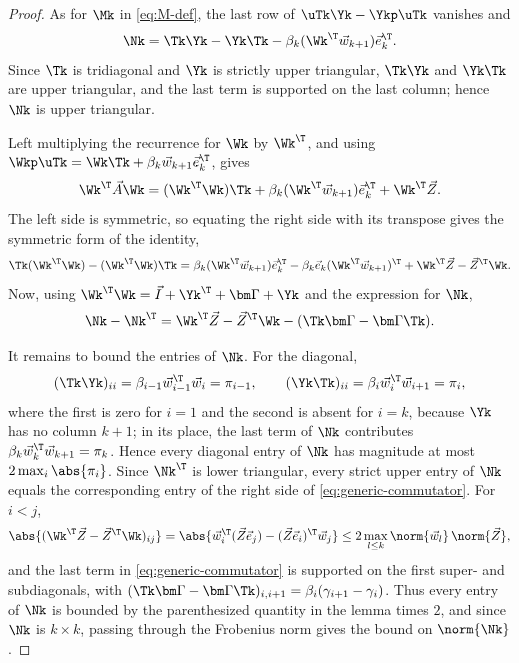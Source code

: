 \begin{proof}
As for \(\Mk\) in \cref{eq:M-def}, the last row of \(\uTk\Yk-\Ykp\uTk\) vanishes and
\[
 \Nk=\Tk\Yk-\Yk\Tk-\beta_k(\Wk^\T\vec w_{k+1})\vec e_k^\T.
\]
Since \(\Tk\) is tridiagonal and \(\Yk\) is strictly upper triangular, \(\Tk\Yk\) and \(\Yk\Tk\) are upper triangular, and the last term is supported on the last column; hence \(\Nk\) is upper triangular.

Left multiplying the recurrence for \(\Wk\) by \(\Wk^\T\), and using \(\Wkp\uTk=\Wk\Tk+\beta_k\vec w_{k+1}\vec e_k^\T\), gives
\[
 \Wk^\T\vec A\Wk
 =(\Wk^\T\Wk)\Tk+\beta_k(\Wk^\T\vec w_{k+1})\vec e_k^\T+\Wk^\T\vec Z.
\]
The left side is symmetric, so equating the right side with its transpose gives the symmetric form of the identity,
\begin{equation}
 \Tk(\Wk^\T\Wk)-(\Wk^\T\Wk)\Tk
 =\beta_k(\Wk^\T\vec w_{k+1})\vec e_k^\T-\beta_k\vec e_k(\Wk^\T\vec w_{k+1})^\T
 +\Wk^\T\vec Z-\vec Z^\T\Wk.
 \label{eq:gram-commutator-full}
\end{equation}
Now, using \(\Wk^\T\Wk=\vec I+\Yk^\T+\bm\Gamma+\Yk\) and the expression for \(\Nk\),
\begin{equation}
 \Nk-\Nk^\T
 =\Wk^\T\vec Z-\vec Z^\T\Wk-(\Tk\bm\Gamma-\bm\Gamma\Tk).
 \label{eq:generic-commutator}
\end{equation}

It remains to bound the entries of \(\Nk\).
For the diagonal,
\[
 (\Tk\Yk)_{ii}
 =\beta_{i-1}\vec w_{i-1}^\T\vec w_i=\pi_{i-1},
 \qquad
 (\Yk\Tk)_{ii}
 =\beta_i\vec w_i^\T\vec w_{i+1}=\pi_i,
\]
where the first is zero for \(i=1\) and the second is absent for \(i=k\), because \(\Yk\) has no column \(k+1\); in its place, the last term of \(\Nk\) contributes \(\beta_k\vec w_k^\T\vec w_{k+1}=\pi_k\).
Hence every diagonal entry of \(\Nk\) has magnitude at most \(2\max_i\abs{\pi_i}\).
Since \(\Nk^\T\) is lower triangular, every strict upper entry of \(\Nk\) equals the corresponding entry of the right side of \cref{eq:generic-commutator}.
For \(i<j\),
\[
 \abs{(\Wk^\T\vec Z-\vec Z^\T\Wk)_{ij}}
 =\abs{\vec w_i^\T(\vec Z\vec e_j)-(\vec Z\vec e_i)^\T\vec w_j}
 \le2\max_{l\le k}\norm{\vec w_l}\,\norm{\vec Z},
\]
and the last term in \cref{eq:generic-commutator} is supported on the first super- and subdiagonals, with \((\Tk\bm\Gamma-\bm\Gamma\Tk)_{i,i+1}=\beta_i(\gamma_{i+1}-\gamma_i)\).
Thus every entry of \(\Nk\) is bounded by the parenthesized quantity in the lemma times \(2\), and since \(\Nk\) is \(k\times k\), passing through the Frobenius norm gives the bound on \(\norm{\Nk}\).
\end{proof}


